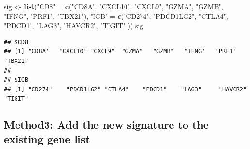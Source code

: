 \documentclass[
  12pt,
]{book}
\newenvironment{Shaded}{\begin{snugshade}}{\end{snugshade}}
\newcommand{\FunctionTok}[1]{\textcolor[rgb]{0.13,0.29,0.53}{\textbf{#1}}}
\newcommand{\NormalTok}[1]{#1}
\newcommand{\OtherTok}[1]{\textcolor[rgb]{0.56,0.35,0.01}{#1}}
\newcommand{\SpecialCharTok}[1]{\textcolor[rgb]{0.81,0.36,0.00}{\textbf{#1}}}
\newcommand{\StringTok}[1]{\textcolor[rgb]{0.31,0.60,0.02}{#1}}
\begin{document}
\begin{Shaded}
\begin{Highlighting}[]
\NormalTok{sig }\OtherTok{\textless{}{-}} \FunctionTok{list}\NormalTok{(}\StringTok{"CD8"} \OtherTok{=} \FunctionTok{c}\NormalTok{(}\StringTok{"CD8A"}\NormalTok{,  }\StringTok{"CXCL10"}\NormalTok{, }\StringTok{"CXCL9"}\NormalTok{,  }\StringTok{"GZMA"}\NormalTok{,   }\StringTok{"GZMB"}\NormalTok{,   }\StringTok{"IFNG"}\NormalTok{,   }\StringTok{"PRF1"}\NormalTok{,   }\StringTok{"TBX21"}\NormalTok{),}
            \StringTok{"ICB"} \OtherTok{=} \FunctionTok{c}\NormalTok{(}\StringTok{"CD274"}\NormalTok{,   }\StringTok{"PDCD1LG2"}\NormalTok{, }\StringTok{"CTLA4"}\NormalTok{,    }\StringTok{"PDCD1"}\NormalTok{,    }\StringTok{"LAG3"}\NormalTok{,     }\StringTok{"HAVCR2"}\NormalTok{,   }\StringTok{"TIGIT"}\NormalTok{ ))}
\NormalTok{sig}
\end{Highlighting}
\end{Shaded}

\begin{verbatim}
## $CD8
## [1] "CD8A"   "CXCL10" "CXCL9"  "GZMA"   "GZMB"   "IFNG"   "PRF1"   "TBX21" 
## 
## $ICB
## [1] "CD274"    "PDCD1LG2" "CTLA4"    "PDCD1"    "LAG3"     "HAVCR2"   "TIGIT"
\end{verbatim}

\hypertarget{method3-add-the-new-signature-to-the-existing-gene-list}{%
\subsection{Method3: Add the new signature to the existing gene list}\label{method3-add-the-new-signature-to-the-existing-gene-list}}

\begin{Shaded}
\end{Shaded}
\end{document}
